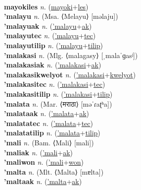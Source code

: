  \label{mayoki} \\
\textbf{mayokiles} \textit{n.} (\hyperref[mayoki]{mayoki}+\hyperref[les]{les})
 \label{mayokiles} \\
\textbf{'malayu} \textit{n.} (Msa. ⟨Melayu⟩ [məlaju])
 \label{'malayu} \\
\textbf{'malayuak} \textit{n.} (\hyperref['malayu]{'malayu}+\hyperref[ak]{ak})
 \label{'malayuak} \\
\textbf{'malayutec} \textit{n.} (\hyperref['malayu]{'malayu}+\hyperref[tec]{tec})
 \label{'malayutec} \\
\textbf{'malayutilip} \textit{n.} (\hyperref['malayu]{'malayu}+\hyperref[tilip]{tilip})
 \label{'malayutilip} \\
\textbf{'malakasi} \textit{n.} (Mlg. ⟨malagasy⟩ [ˌmalaˈɡasʲ])
 \label{'malakasi} \\
\textbf{'malakasiak} \textit{n.} (\hyperref['malakasi]{'malakasi}+\hyperref[ak]{ak})
 \label{'malakasiak} \\
\textbf{'malakasikwelyot} \textit{n.} (\hyperref['malakasi]{'malakasi}+\hyperref[kwelyot]{kwelyot})
 \label{'malakasikwelyot} \\
\textbf{'malakasitec} \textit{n.} (\hyperref['malakasi]{'malakasi}+\hyperref[tec]{tec})
 \label{'malakasitec} \\
\textbf{'malakasitilip} \textit{n.} (\hyperref['malakasi]{'malakasi}+\hyperref[tilip]{tilip})
 \label{'malakasitilip} \\
\textbf{'malata} \textit{n.} (Mar. ⟨मराठा⟩ [məˈɾaʈʰa])
 \label{'malata} \\
\textbf{'malataak} \textit{n.} (\hyperref['malata]{'malata}+\hyperref[ak]{ak})
 \label{'malataak} \\
\textbf{'malatatec} \textit{n.} (\hyperref['malata]{'malata}+\hyperref[tec]{tec})
 \label{'malatatec} \\
\textbf{'malatatilip} \textit{n.} (\hyperref['malata]{'malata}+\hyperref[tilip]{tilip})
 \label{'malatatilip} \\
\textbf{'mali} \textit{n.} (Bam. ⟨Mali⟩ [mali])
 \label{'mali} \\
\textbf{'maliak} \textit{n.} (\hyperref['mali]{'mali}+\hyperref[ak]{ak})
 \label{'maliak} \\
\textbf{'maliwon} \textit{n.} (\hyperref['mali]{'mali}+\hyperref[won]{won})
 \label{'maliwon} \\
\textbf{'malta} \textit{n.} (Mlt. ⟨Malta⟩ [mɐlta])
 \label{'malta} \\
\textbf{'maltaak} \textit{n.} (\hyperref['malta]{'malta}+\hyperref[ak]{ak})
